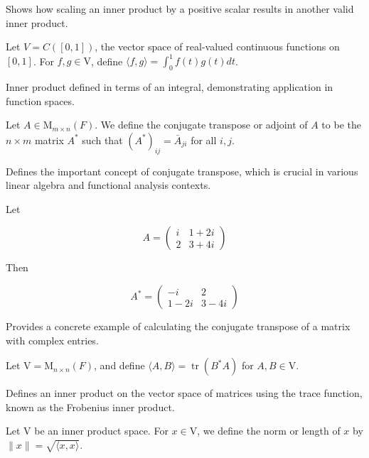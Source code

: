\documentclass{report}
\begin{document}
    Shows how scaling an inner product by a positive scalar results in another valid inner product.


    \begin{Example}
        Let $V=C([0,1])$, the vector space of real-valued continuous functions on $[0,1]$. For $f, g \in \mathrm{V}$, define $\langle f, g\rangle=\int_{0}^{1} f(t) g(t) d t$.
    \end{Example}

    Inner product defined in terms of an integral, demonstrating application in function spaces.


    \begin{defBox}
        Let $A \in \mathrm{M}_{m \times n}(F)$. We define the conjugate transpose or adjoint of $A$ to be the $n \times m$ matrix $A^{*}$ such that $\left(A^{*}\right)_{i j}=\bar{A}_{j i}$ for all $i, j$.
    \end{defBox}

    Defines the important concept of conjugate transpose, which is crucial in various linear algebra and functional analysis contexts.


    \begin{Example}
        Let

        \[
        A=\left(\begin{array}{ll}
        i & 1+2 i \\
        2 & 3+4 i
        \end{array}\right)
        \]

        Then

        \[
        A^{*}=\left(\begin{array}{cc}
        -i & 2 \\
        1-2 i & 3-4 i
        \end{array}\right)
        \]
    \end{Example}

    Provides a concrete example of calculating the conjugate transpose of a matrix with complex entries.


    \begin{Example}
        Let $\mathrm{V}=\mathrm{M}_{n \times n}(F)$, and define $\langle A, B\rangle=\operatorname{tr}\left(B^{*} A\right)$ for $A, B \in \mathrm{V}$.
    \end{Example}

    Defines an inner product on the vector space of matrices using the trace function, known as the Frobenius inner product.


    \begin{defBox}
        Let $\mathrm{V}$ be an inner product space. For $x \in \mathrm{V}$, we define the norm or length of $x$ by $\|x\|=\sqrt{\langle x, x\rangle}$.
    \end{defBox}
\end{document}
